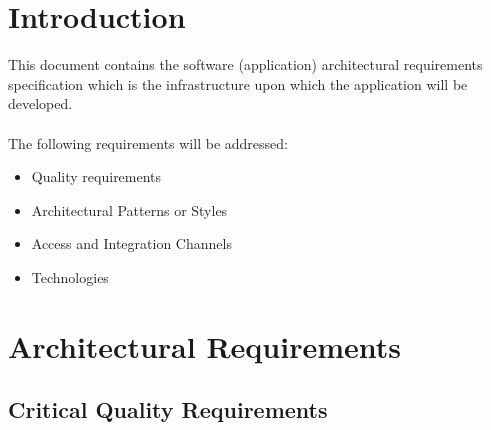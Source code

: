 \documentclass[hidelinks, 12pt, oneside]{article}
\begin{document}
	
	\tableofcontents
	\newpage
	
	\section{Introduction}
	
	This document contains the software (application) architectural requirements specification which is the infrastructure upon which the application will be developed.\\\\
	The following requirements will be addressed:
	\begin{itemize}
		\item Quality requirements
		\item Architectural Patterns or Styles
		\item Access and Integration Channels
		\item Technologies
	\end{itemize}	 
	\newpage
	\section{Architectural Requirements}
		\subsection{Critical Quality Requirements} 
\end{document}
